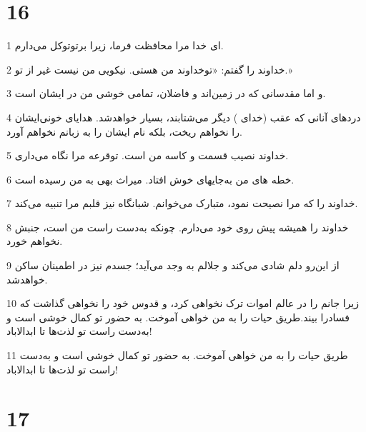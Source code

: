 \chapter{16}

\par 1 ای خدا مرا محافظت فرما، زیرا برتوتوکل می‌دارم.
\par 2 خداوند را گفتم: «توخداوند من هستی. نیکویی من نیست غیر از تو.»
\par 3 و اما مقدسانی که در زمین‌اند و فاضلان، تمامی خوشی من در ایشان است.
\par 4 دردهای آنانی که عقب (خدای ) دیگر می‌شتابند، بسیار خواهدشد. هدایای خونی‌ایشان را نخواهم ریخت، بلکه نام ایشان را به زبانم نخواهم آورد.
\par 5 خداوند نصیب قسمت و کاسه من است. توقرعه مرا نگاه می‌داری.
\par 6 خطه های من به‌جایهای خوش افتاد. میراث بهی به من رسیده است.
\par 7 خداوند را که مرا نصیحت نمود، متبارک می‌خوانم. شبانگاه نیز قلبم مرا تنبیه می‌کند.
\par 8 خداوند را همیشه پیش روی خود می‌دارم. چونکه به‌دست راست من است، جنبش نخواهم خورد.
\par 9 از این‌رو دلم شادی می‌کند و جلالم به وجد می‌آید؛ جسدم نیز در اطمینان ساکن خواهدشد.
\par 10 زیرا جانم را در عالم اموات ترک نخواهی کرد، و قدوس خود را نخواهی گذاشت که فسادرا بیند.طریق حیات را به من خواهی آموخت. به حضور تو کمال خوشی است و به‌دست راست تو لذت‌ها تا ابدالاباد!
\par 11 طریق حیات را به من خواهی آموخت. به حضور تو کمال خوشی است و به‌دست راست تو لذت‌ها تا ابدالاباد!
 
\chapter{17}

